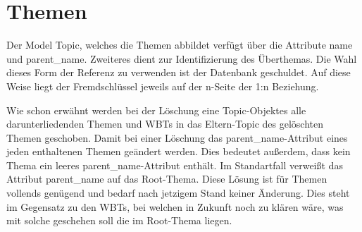 \section{Themen}
Der Model Topic, welches die Themen abbildet verfügt über die Attribute name und
parent\_name. Zweiteres dient zur Identifizierung des Überthemas. Die Wahl
dieses Form der Referenz zu verwenden ist der Datenbank geschuldet. Auf diese Weise
liegt der Fremdschlüssel jeweils auf der n-Seite der 1:n Beziehung.

Wie schon erwähnt werden bei der Löschung eine Topic-Objektes alle
darunterliedenden Themen und WBTs in das Eltern-Topic des gelöschten Themen
geschoben. Damit bei einer Löschung das parent\_name-Attribut eines jeden
enthaltenen Themen geändert werden. Dies bedeutet außerdem, dass kein Thema ein
leeres parent\_name-Attribut enthält. Im Standartfall verweißt das
Attribut parent\_name auf das Root-Thema. Diese Lösung ist für Themen vollends
genügend und bedarf nach jetzigem Stand keiner Änderung. Dies steht im Gegensatz
zu den WBTs, bei welchen in Zukunft noch zu klären wäre, was mit solche
geschehen soll die im Root-Thema liegen. 